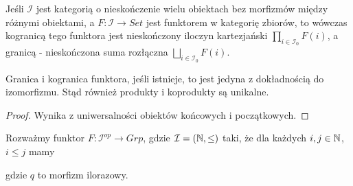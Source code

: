 {\begin{example}[m]
  \item Jeśli $\mathcal{I}$ jest kategorią o nieskończenie wielu obiektach bez morfizmów między różnymi obiektami, a $F:\mathcal{I}\to Set$ jest funktorem w kategorię zbiorów, to wówczas kogranicą tego funktora jest nieskończony iloczyn kartezjański $\prod_{i\in\mathcal{I}_0}F(i)$, a granicą - nieskończona suma rozłączna $\bigsqcup_{i\in\mathcal{I}_0}F(i)$.
\end{example}


\begin{fact}{}{}
  Granica i kogranica funktora, jeśli istnieje, to jest jedyna z dokładnością do izomorfizmu. Stąd również produkty i koprodukty są unikalne.
\end{fact}

\begin{proof}
  Wynika z uniwersalności obiektów końcowych i początkowych.
\end{proof}

%

\begin{example}
  Rozważmy funktor $F:\mathcal{I}^{op}\to Grp$, gdzie $\mathcal{I}=(\mathbb{N}, \leq)$ taki, że dla każdych $i,j\in\mathbb{N}$, $i\leq j$ mamy
  \begin{center}
  \end{center}
  gdzie $q$ to morfizm ilorazowy.


\end{example}}
